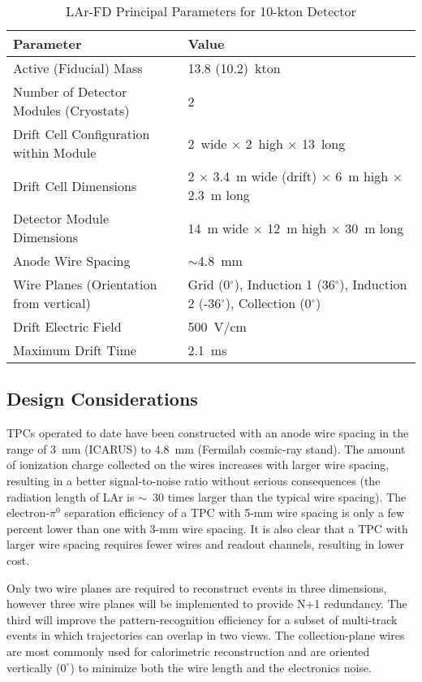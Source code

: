 \begin{table}[htpb]
\caption{LAr-FD Principal Parameters for 10-kton Detector}
\label{table:param-summ-larfd}
\centering
 \begin{tabular}[htbp]{|l|| p{6cm} |}
\hline
Parameter & Value  \\
\hline\hline
Active (Fiducial) Mass &   13.8 (10.2)~kton \\
\hline
Number of Detector Modules (Cryostats) &  2 \\
\hline
Drift Cell Configuration within Module &  2~wide $\times$ 2~high $\times$ 13~long \\
\hline
Drift Cell Dimensions  &  2 $\times$ 3.4~m wide (drift) $\times$ 6~m high $\times$ 2.3~m long \\
\hline
Detector Module Dimensions &  14~m wide $\times$ 12~m high $\times$  30~m long \\
\hline
Anode Wire Spacing &  $\sim$4.8~mm \\
\hline
Wire Planes (Orientation from vertical) & Grid (0$^\circ$), Induction 1 (36$^\circ$), Induction 2 (-36$^\circ$), Collection (0$^\circ$) \\
\hline
Drift Electric Field &  500~V/cm \\ 
\hline
Maximum Drift Time & 2.1~ms \\
\hline
\end{tabular} 
\end{table}

\subsection{Design Considerations}

TPCs operated to date have been constructed with an anode wire spacing in the range of 3~mm (ICARUS) to 4.8~mm (Fermilab cosmic-ray stand). The amount of ionization charge collected on the wires increases with larger wire spacing, resulting in a better signal-to-noise ratio without serious consequences (the radiation length of LAr is $\sim$~30 times larger than the typical wire spacing). The electron-$\pi^0$ separation efficiency of a TPC with 5-mm wire spacing is only a few percent lower than one with 3-mm wire spacing. It is also clear that a TPC with larger wire spacing requires fewer wires and readout channels, resulting in lower cost. %

Only two wire planes are required to reconstruct events in three dimensions, however three wire planes will be implemented to provide N+1 redundancy. The third will improve the pattern-recognition efficiency for a subset of multi-track events in which trajectories can overlap in two views. The collection-plane wires are most commonly used for calorimetric reconstruction and are oriented vertically ($0^\circ$) to minimize both the wire length and the electronics noise.

